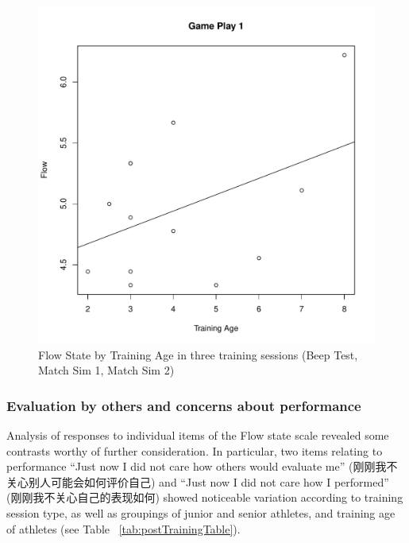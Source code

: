 \begin{CJK}{UTF8}{gbsn}
\begin{figure}[htbp]
\includegraphics[scale=.2]{images/flow0109TrainingAge.pdf}
  \caption{Flow State by Training Age in three training sessions (Beep Test, Match Sim 1, Match Sim 2)}
  \label{fig:flowTrainingAge}
\end{figure}

\subsubsection{Evaluation by others and concerns about performance}
Analysis of responses to individual items of the Flow state scale revealed some contrasts worthy of further consideration.  In particular, two items relating to performance ``Just now I did not care how others would evaluate me'' (刚刚我不关心别人可能会如何评价自己) and ``Just now I did not care how I performed'' (刚刚我不关心自己的表现如何) showed noticeable variation according to training session type, as well as groupings of junior and senior athletes, and training age of athletes (see Table ~\ref{tab:postTrainingTable}).


\end{CJK}
